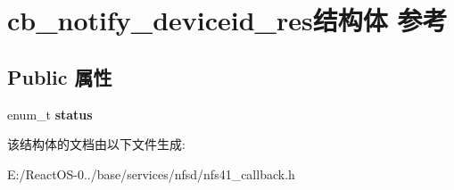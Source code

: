 \hypertarget{structcb__notify__deviceid__res}{}\section{cb\+\_\+notify\+\_\+deviceid\+\_\+res结构体 参考}
\label{structcb__notify__deviceid__res}
\subsection*{Public 属性}
\begin{DoxyCompactItemize}
\item 
\mbox{\label{structcb__notify__deviceid__res_a5e5b507ade9ed62ec3c505607f450034}} 
enum\+\_\+t {\bfseries status}
\end{DoxyCompactItemize}


该结构体的文档由以下文件生成\+:\begin{DoxyCompactItemize}
\item 
E\+:/\+React\+O\+S-\/0../base/services/nfsd/nfs41\+\_\+callback.\+h\end{DoxyCompactItemize}
